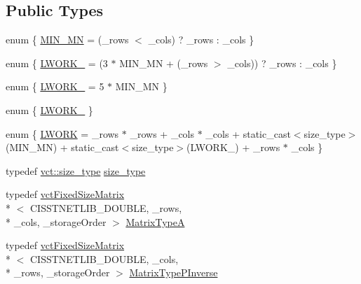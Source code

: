 \subsection*{Public Types}
\begin{DoxyCompactItemize}
\item 
enum \{ \hyperlink{classnmr_p_inverse_fixed_size_data_a00763e211eaac400820a79a1637c7b88adf9d8cea78dd81b86e5831a9239a5fa4}{M\-I\-N\-\_\-\-M\-N} = (\-\_\-rows $<$ \-\_\-cols) ? \-\_\-rows \-: \-\_\-cols
 \}
\item 
enum \{ \hyperlink{classnmr_p_inverse_fixed_size_data_a5104456fc4aacd6c458bf242f32c72b9a60e3236d13484907be4692efd011a7eb}{L\-W\-O\-R\-K\-\_} = (3 $\ast$ M\-I\-N\-\_\-\-M\-N + (\-\_\-rows $>$ \-\_\-cols)) ? \-\_\-rows \-: \-\_\-cols
 \}
\item 
enum \{ \hyperlink{classnmr_p_inverse_fixed_size_data_a507ef37a498927f8d1dccc600ef54366ac1384f97bdf70c5c623fef4d564271cb}{L\-W\-O\-R\-K\-\_} = 5 $\ast$ M\-I\-N\-\_\-\-M\-N
 \}
\item 
enum \{ \hyperlink{classnmr_p_inverse_fixed_size_data_ab1276f85c8bba0fd1b6864e1c77adf55a984bafe542256ba33b6e9d1c533c5613}{L\-W\-O\-R\-K\-\_}
 \}
\item 
enum \{ \hyperlink{classnmr_p_inverse_fixed_size_data_a9b39b6a640dc1ecb63ee29b568ef8bdaac2833dfeeaa50db019a1f393c7b43f6d}{L\-W\-O\-R\-K} = \-\_\-rows $\ast$ \-\_\-rows + \-\_\-cols $\ast$ \-\_\-cols + static\-\_\-cast$<$size\-\_\-type$>$(M\-I\-N\-\_\-\-M\-N) + static\-\_\-cast$<$size\-\_\-type$>$(L\-W\-O\-R\-K\-\_) + \-\_\-rows $\ast$ \-\_\-cols
 \}
\item 
typedef \hyperlink{namespacevct_a3e2935e13aac4500965e00d30565775b}{vct\-::size\-\_\-type} \hyperlink{classnmr_p_inverse_fixed_size_data_a10ebf99e82bb3dd2afd42fc723fac07b}{size\-\_\-type}
\item 
typedef \hyperlink{classvct_fixed_size_matrix}{vct\-Fixed\-Size\-Matrix}\\*
$<$ C\-I\-S\-S\-T\-N\-E\-T\-L\-I\-B\-\_\-\-D\-O\-U\-B\-L\-E, \-\_\-rows, \\*
\-\_\-cols, \-\_\-storage\-Order $>$ \hyperlink{classnmr_p_inverse_fixed_size_data_a3ea248e2be6732ed0138508f1dae09d6}{Matrix\-Type\-A}
\item 
typedef \hyperlink{classvct_fixed_size_matrix}{vct\-Fixed\-Size\-Matrix}\\*
$<$ C\-I\-S\-S\-T\-N\-E\-T\-L\-I\-B\-\_\-\-D\-O\-U\-B\-L\-E, \-\_\-cols, \\*
\-\_\-rows, \-\_\-storage\-Order $>$ \hyperlink{classnmr_p_inverse_fixed_size_data_a6c4787ecd9e2e7155fd857fb4427c7b0}{Matrix\-Type\-P\-Inverse}

\end{DoxyCompactItemize}
